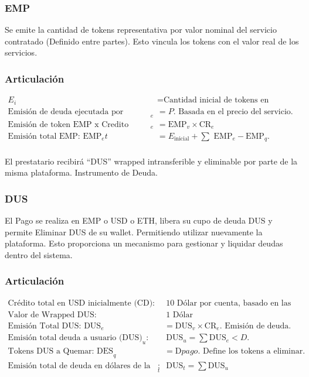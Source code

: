 \documentclass{article}
\begin{document}
\subsubsection*{EMP}
Se emite la cantidad de tokens representativa por valor nominal del servicio contratado (Definido entre partes). Esto vincula los tokens con el valor real de los servicios.

\subsubsection*{Articulación}
\begin{align*}
    E_i & = \text{Cantidad inicial de tokens en circulación.} \\
    \text{Emisión de deuda ejecutada por Crédito Utilizado: CR}_e & = P. \text{ Basada en el precio del servicio.} \\
    \text{Emisión de token EMP x Credito utilizado: EMP}_e & = \text{EMP}_v \times \text{CR}_e\\
    \text{Emisión total EMP: EMP}_et & = E_{\text{inicial}} + \sum \text{ EMP}_e - \text{EMP}_q. \\
\end{align*}

El prestatario recibirá “DUS” wrapped intransferible y eliminable por parte de la misma plataforma. Instrumento de Deuda.

\subsubsection*{DUS}

El Pago se realiza en EMP o USD o ETH, libera su cupo de deuda DUS y permite Eliminar DUS de su wallet. Permitiendo utilizar nuevamente la plataforma. Esto proporciona un mecanismo para gestionar y liquidar deudas dentro del sistema.

\subsubsection*{Articulación}
\begin{align*}
    \text{Crédito total en USD inicialmente (CD):} &\ 10 \text{ Dólar por cuenta, basado en las reservas.} \\
    \text{Valor de Wrapped DUS:} &\ 1 \text{ Dólar} \\
    \text{Emisión Total DUS: DUS}_e & = \text{DUS}_v \times \text{CR}_e. \text{ Emisión de deuda.} \\
    \text{Emisión total deuda a usuario (DUS)}_u: &\ \text{DUS}_u = \sum \text{DUS}_e < D. \\
    \text{Tokens DUS a Quemar: DES}_q & = \text{D}pago. \text{ Define los tokens a eliminar.} \\
    \text{Emisión total de deuda en dólares de la plataforma (DUS)}_t: &\ \text{DUS}_t = \sum \text{DUS}_u
\end{align*}
\end{document}
